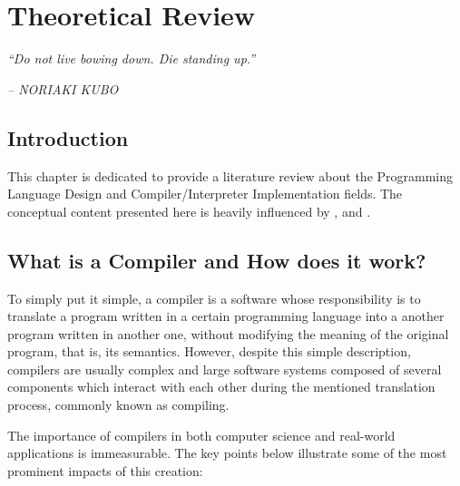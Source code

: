 \chapter{Theoretical Review} \label{Cap:theoretical_review}

\begin{displayquote}
    \begin{center}
        \textit{``Do not live bowing down. Die standing up.''}
    \end{center}
\end{displayquote}

\begin{flushright}
   \textit{-- NORIAKI KUBO}
\end{flushright}

\section{Introduction}
This chapter is dedicated to provide a literature review about the Programming Language Design and Compiler/Interpreter Implementation fields. The conceptual content presented here is heavily influenced by \cite{aho1986compilers}, \cite{cooper2022engineering} and \cite{nystrom2021crafting}.

\section{What is a Compiler and How does it work?}
To simply put it simple, a compiler is a software whose responsibility is to translate a program written in a certain programming language into a another program written in another one, without modifying the meaning of the original program, that is, its semantics. However, despite this simple description, compilers are usually complex and large software systems composed of several components which interact with each other during the mentioned translation process, commonly known as compiling.

The importance of compilers in both computer science and real-world applications is immeasurable. The key points below illustrate some of the most prominent impacts of this creation:

